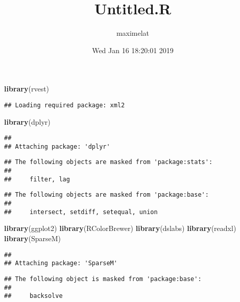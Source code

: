 \documentclass[]{article}
\title{Untitled.R}
\author{maximelat}
\date{Wed Jan 16 18:20:01 2019}
\newenvironment{Shaded}{\begin{snugshade}}{\end{snugshade}}
\newcommand{\KeywordTok}[1]{\textcolor[rgb]{0.13,0.29,0.53}{\textbf{#1}}}
\newcommand{\NormalTok}[1]{#1}
\begin{document}
\maketitle

\begin{Shaded}
\begin{Highlighting}[]
\KeywordTok{library}\NormalTok{(rvest)}
\end{Highlighting}
\end{Shaded}

\begin{verbatim}
## Loading required package: xml2
\end{verbatim}

\begin{Shaded}
\begin{Highlighting}[]
\KeywordTok{library}\NormalTok{(dplyr)}
\end{Highlighting}
\end{Shaded}

\begin{verbatim}
## 
## Attaching package: 'dplyr'
\end{verbatim}

\begin{verbatim}
## The following objects are masked from 'package:stats':
## 
##     filter, lag
\end{verbatim}

\begin{verbatim}
## The following objects are masked from 'package:base':
## 
##     intersect, setdiff, setequal, union
\end{verbatim}

\begin{Shaded}
\begin{Highlighting}[]
\KeywordTok{library}\NormalTok{(ggplot2)}
\KeywordTok{library}\NormalTok{(RColorBrewer)}
\KeywordTok{library}\NormalTok{(dslabs)}
\KeywordTok{library}\NormalTok{(readxl)}
\KeywordTok{library}\NormalTok{(SparseM)}
\end{Highlighting}
\end{Shaded}

\begin{verbatim}
## 
## Attaching package: 'SparseM'
\end{verbatim}

\begin{verbatim}
## The following object is masked from 'package:base':
## 
##     backsolve
\end{verbatim}
\end{document}
